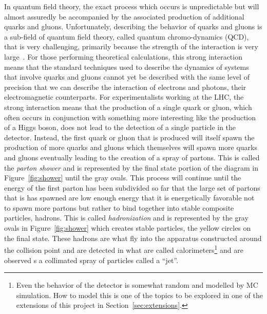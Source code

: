 \documentclass[UKenglish,texlive=2016]{\ATLASLATEXPATH atlasdoc}
\begin{document}
In quantum field theory, the exact process which occurs is unpredictable but will almost assuredly be accompanied by the associated production of additional quarks and gluons.  Unfortunately, describing the behavior of quarks and gluons is a sub-field of quantum field theory, called quantum chromo-dynamics (QCD), that is very challenging, primarily because the strength of the interaction is very large~\cite{wilcek:nobel}.  For those performing theoretical calculations, this strong interaction means that the standard techniques used to describe the dynamics of systems that involve quarks and gluons cannot yet be described with the same level of precision that we can describe the interaction of electrons and photons, their electromagnetic counterparts.  For experimentalists working at the LHC, the strong interaction means that the production of a single quark or gluon, which often occurs in conjunction with something more interesting like the production of a Higgs boson, does not lead to the detection of a single particle in the detector.  Instead, the first quark or gluon that is produced will itself spawn the production of more quarks and gluons which themselves will spawn more quarks and gluons eventually leading to the creation of a spray of partons.  This is called the \textit{parton shower} and is represented by the final state portion of the diagram in Figure~\ref{fig:shower} until the gray ovals.  This process will continue until the energy of the first parton has been subdivided so far that the large set of partons that is has spawned are low enough energy that it is energetically favorable not to spawn more partons but rather to bind together into stable composite particles, hadrons.  This is called \textit{hadronization} and is represented by the gray ovals in Figure~\ref{fig:shower} which creates stable particles, the yellow circles on the final state.  These hadrons are what fly into the apparatus constructed around the collision point and are detected in what are called calorimeters\footnote{Even the behavior of the detector is somewhat random and modelled by MC simulation.  How to model this is one of the topics to be explored in one of the extensions of this project in Section~\ref{sec:extensions}.} and are observed s a collimated spray of particles called a ``jet''.
\end{document}

